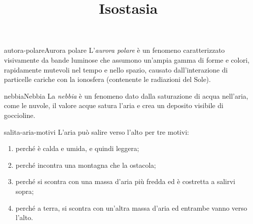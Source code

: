 \documentclass[preview]{standalone}
\begin{document}
\title{Isostasia}
\genpage

\begin{snippetdefinition}{autora-polare}{Aurora polare}
    L'\textit{aurora polare} è un fenomeno
    caratterizzato visivamente da bande luminose che assumono un'ampia gamma di forme e colori, rapidamente mutevoli nel tempo e nello spazio,
    causato dall'interazione di particelle cariche con la ionosfera (contenente le radiazioni del Sole).
\end{snippetdefinition}



\begin{snippetdefinition}{nebbia}{Nebbia}
    La \textit{nebbia} è un fenomeno dato dalla saturazione di acqua nell'aria,
    come le nuvole, il valore acque satura l'aria e crea un deposito visibile di goccioline.
\end{snippetdefinition}




\begin{snippet}{salita-aria-motivi}
    L'aria può salire verso l'alto per tre motivi:
    \begin{enumerate}
        \item perché è calda e umida, e quindi leggera;
        \item perché incontra una montagna che la ostacola;
        \item perché si scontra con una massa d'aria più fredda ed è costretta a salirvi sopra;
        \item perché a terra, si scontra con un'altra massa d'aria ed entrambe vanno verso l'alto.
    \end{enumerate}
\end{snippet}
\end{document}
